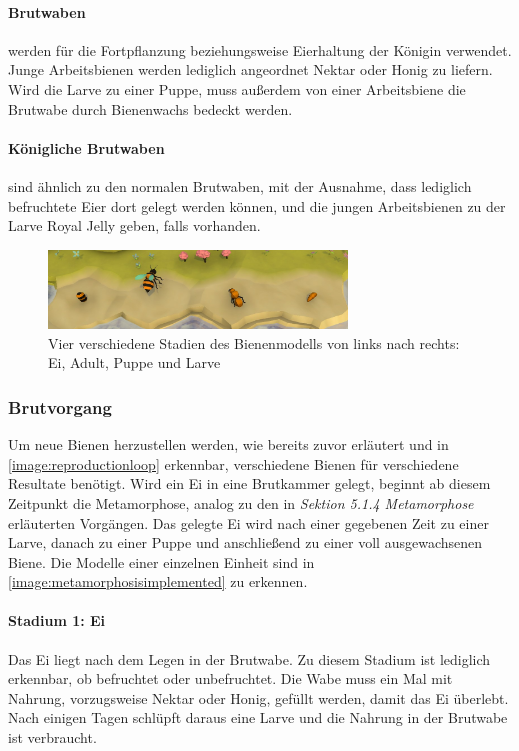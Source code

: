 \paragraph{Brutwaben} werden für die Fortpflanzung beziehungsweise Eierhaltung der Königin verwendet. Junge Arbeitsbienen werden lediglich angeordnet Nektar oder Honig zu liefern. Wird die Larve zu einer Puppe, muss außerdem von einer Arbeitsbiene die Brutwabe durch Bienenwachs bedeckt werden.

\paragraph{Königliche Brutwaben} sind ähnlich zu den normalen Brutwaben, mit der Ausnahme, dass lediglich befruchtete Eier dort gelegt werden können, und die jungen Arbeitsbienen zu der Larve Royal Jelly geben, falls vorhanden.

\begin{figure}
    \begin{center}
        \includegraphics[width=300px]{0.bilder/metamorphosisimplemented.jpg}
    \end{center}
    \caption{Vier verschiedene Stadien des Bienenmodells von links nach rechts: Ei, Adult, Puppe und Larve} \label{image:metamorphosisimplemented}
\end{figure}

\subsubsection{Brutvorgang}
Um neue Bienen herzustellen werden, wie bereits zuvor erläutert und in \autoref{image:reproductionloop} erkennbar, verschiedene Bienen für verschiedene Resultate benötigt. Wird ein Ei in eine Brutkammer gelegt, beginnt ab diesem Zeitpunkt die Metamorphose, analog zu den in \textit{Sektion 5.1.4 Metamorphose} erläuterten Vorgängen. Das gelegte Ei wird nach einer gegebenen Zeit zu einer Larve, danach zu einer Puppe und anschließend zu einer voll ausgewachsenen Biene. Die Modelle einer einzelnen Einheit sind in \autoref{image:metamorphosisimplemented} zu erkennen.

\paragraph{Stadium 1: Ei} Das Ei liegt nach dem Legen in der Brutwabe. Zu diesem Stadium ist lediglich erkennbar, ob befruchtet oder unbefruchtet. Die Wabe muss ein Mal mit Nahrung, vorzugsweise Nektar oder Honig, gefüllt werden, damit das Ei überlebt. Nach einigen Tagen schlüpft daraus eine Larve und die Nahrung in der Brutwabe ist verbraucht.

